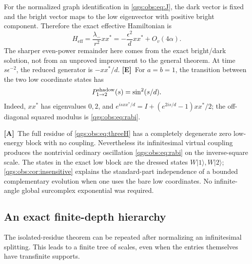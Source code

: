 \documentclass[11pt,oneside]{article}
\numberwithin{equation}{section}
\theoremstyle{plain}
\theoremstyle{definition}
\theoremstyle{remark}
\newcommand{\Heff}{H_{\mathrm{eff}}}
\newcommand{\Oval}[1]{O_{v}(#1)}
\newcommand{\ket}[1]{\lvert#1\rangle}
\newcommand{\TE}{\textcolor{TierE}{\textsf{\bfseries[E]}}}
\newcommand{\TA}{\textcolor{TierA}{\textsf{\bfseries[A]}}}
\begin{document}
For the normalized graph identification in \eqref{qgs:obs:eq:J}, the dark vector is fixed and the bright vector maps to the low eigenvector with positive bright component. Therefore the exact effective Hamiltonian is
\begin{equation}\label{qgs:obs:eq:threeheff}
 \Heff=\frac{\lambda_-}{r^2}xx^*
 =-\frac{\epsilon^2}{d}xx^*+\Oval{4\alpha}.
\end{equation}
The sharper even-power remainder here comes from the exact bright/dark solution, not from an unproved improvement to the general theorem. At time $s\epsilon^{-2}$, the reduced generator is $-xx^*/d$. \TE\ For $a=b=1$, the transition between the two low coordinate states has
\begin{equation}\label{qgs:obs:eq:rabi}
 P_{1\to2}^{\rm shadow}(s)=\sin^2(s/d).
\end{equation}
Indeed, $xx^*$ has eigenvalues $0,2$, and $e^{isxx^*/d}=I+(e^{2is/d}-1)xx^*/2$; the off-diagonal squared modulus is \eqref{qgs:obs:eq:rabi}.

\TA\ The full residue of \eqref{qgs:obs:eq:threeH} has a completely degenerate zero low-energy block with no coupling. Nevertheless its infinitesimal virtual coupling produces the nontrivial ordinary oscillation \eqref{qgs:obs:eq:rabi} on the inverse-square scale. The states in the exact low block are the dressed states $W\ket1,W\ket2$; \cref{qgs:obs:cor:insensitive} explains the standard-part independence of a bounded complementary evolution when one uses the bare low coordinates. No infinite-angle global surcomplex exponential was required.

\subsection{An exact finite-depth hierarchy}\label{qgs:obs:sec:hierarchy}
The isolated-residue theorem can be repeated after normalizing an infinitesimal splitting. This leads to a finite tree of scales, even when the entries themselves have transfinite supports.
\end{document}
